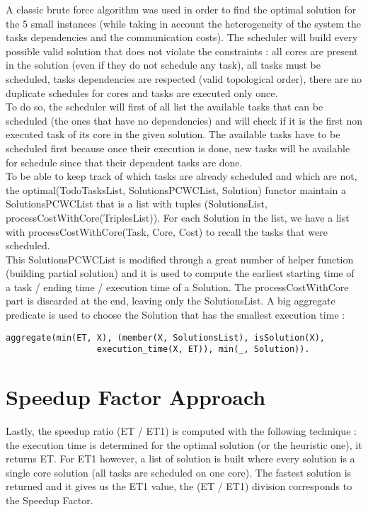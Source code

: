 \documentclass[11pt, a4paper, margin = 1.3cm]{article}
\begin{document}
A classic brute force algorithm was used in order to find the optimal solution for the 5 small instances (while taking in account the heterogeneity of the system the tasks dependencies and the communication costs). The scheduler will build every possible valid solution that does not violate the constraints : all cores are present in the solution (even if they do not schedule any task), all tasks must be scheduled, tasks dependencies are respected (valid topological order), there are no duplicate schedules for cores and tasks are executed only once. \\

To do so, the scheduler will first of all list the available tasks that can be scheduled (the ones that have no dependencies) and will check if it is the first non executed task of its core in the given solution. The available tasks have to be scheduled first because once their execution is done, new tasks will be available for schedule since that their dependent tasks are done. \\

To be able to keep track of which tasks are already scheduled and which are not, the optimal(TodoTasksList, SolutionsPCWCList, Solution) functor maintain a SolutionsPCWCList that is a list with tuples (SolutionsList, processCostWithCore(TriplesList)). For each Solution in the list, we have a list with processCostWithCore(Task, Core, Cost) to recall the tasks that were scheduled. \\

This SolutionsPCWCList is modified through a great number of helper function (building partial solution) and it is used to compute the earliest starting time of a task / ending time / execution time of a Solution. The processCostWithCore part is discarded at the end, leaving only the SolutionsList. A big aggregate predicate is used to choose the Solution that has the smallest execution time : 

\begin{verbatim}
aggregate(min(ET, X), (member(X, SolutionsList), isSolution(X), 
				  execution_time(X, ET)), min(_, Solution)). 
\end{verbatim}

\section{Speedup Factor Approach}

Lastly, the speedup ratio (ET / ET1) is computed with the following technique : the execution time is determined for the optimal solution (or the heuristic one), it returns ET. For ET1 however, a list of solution is built where every solution is a single core solution (all tasks are scheduled on one core). The fastest solution is returned and it gives us the ET1 value, the (ET / ET1) division corresponds to the Speedup Factor. 
\end{document}
